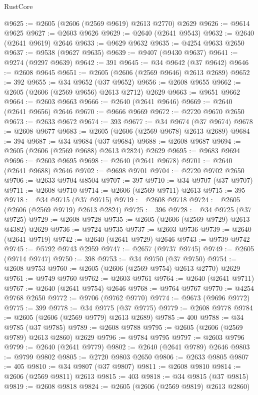 \begin{lexlean}{RustCore}
\begin{coremodule}
@9625 := @2605 (@2606 (@2569 @9619) @2613 @2770) @2629
@9626 := @9614 @9625
@9627 := @2603 @9626
@9629 := @2640 (@2641 @9543)
@9632 := @2640 (@2641 @9619) @2646
@9633 := @9629 @9632
@9635 := @4254 @9633 @2650
@9637 := @9538 (@9627 @9635)
@9639 := @9407 (@9430 @9637)
@9641 := @9274 (@9297 @9639)
@9642 := 391
@9645 := @34 @9642 (@37 @9642)
@9646 := @2608 @9645
@9651 := @2605 (@2606 (@2569 @9646) @2613 @2689)
@9652 := 392
@9655 := @34 @9652 (@37 @9652)
@9656 := @2608 @9655
@9662 := @2605 (@2606 (@2569 @9656) @2613 @2712) @2629
@9663 := @9651 @9662
@9664 := @2603 @9663
@9666 := @2640 (@2641 @9646)
@9669 := @2640 (@2641 @9656) @2646
@9670 := @9666 @9669
@9672 := @2720 @9670 @2650
@9673 := @2633 @9672
@9674 := 393
@9677 := @34 @9674 (@37 @9674)
@9678 := @2608 @9677
@9683 := @2605 (@2606 (@2569 @9678) @2613 @2689)
@9684 := 394
@9687 := @34 @9684 (@37 @9684)
@9688 := @2608 @9687
@9694 := @2605 (@2606 (@2569 @9688) @2613 @2824) @2629
@9695 := @9683 @9694
@9696 := @2603 @9695
@9698 := @2640 (@2641 @9678)
@9701 := @2640 (@2641 @9688) @2646
@9702 := @9698 @9701
@9704 := @2720 @9702 @2650
@9706 := @2633 @9704 @8504
@9707 := 397
@9710 := @34 @9707 (@37 @9707)
@9711 := @2608 @9710
@9714 := @2606 (@2569 @9711) @2613
@9715 := 395
@9718 := @34 @9715 (@37 @9715)
@9719 := @2608 @9718
@9724 := @2605 (@2606 (@2569 @9719) @2613 @2824)
@9725 := 396
@9728 := @34 @9725 (@37 @9725)
@9729 := @2608 @9728
@9735 := @2605 (@2606 (@2569 @9729) @2613 @4382) @2629
@9736 := @9724 @9735
@9737 := @2603 @9736
@9739 := @2640 (@2641 @9719)
@9742 := @2640 (@2641 @9729) @2646
@9743 := @9739 @9742
@9745 := @5792 @9743 @2959
@9747 := @2657 (@9737 @9745)
@9749 := @2605 (@9714 @9747)
@9750 := 398
@9753 := @34 @9750 (@37 @9750)
@9754 := @2608 @9753
@9760 := @2605 (@2606 (@2569 @9754) @2613 @2770) @2629
@9761 := @9749 @9760
@9762 := @2603 @9761
@9764 := @2640 (@2641 @9711)
@9767 := @2640 (@2641 @9754) @2646
@9768 := @9764 @9767
@9770 := @4254 @9768 @2650
@9772 := @9706 (@9762 @9770)
@9774 := @9673 (@9696 @9772)
@9775 := 399
@9778 := @34 @9775 (@37 @9775)
@9779 := @2608 @9778
@9784 := @2605 (@2606 (@2569 @9779) @2613 @2689)
@9785 := 400
@9788 := @34 @9785 (@37 @9785)
@9789 := @2608 @9788
@9795 := @2605 (@2606 (@2569 @9789) @2613 @2860) @2629
@9796 := @9784 @9795
@9797 := @2603 @9796
@9799 := @2640 (@2641 @9779)
@9802 := @2640 (@2641 @9789) @2646
@9803 := @9799 @9802
@9805 := @2720 @9803 @2650
@9806 := @2633 @9805
@9807 := 405
@9810 := @34 @9807 (@37 @9807)
@9811 := @2608 @9810
@9814 := @2606 (@2569 @9811) @2613
@9815 := 403
@9818 := @34 @9815 (@37 @9815)
@9819 := @2608 @9818
@9824 := @2605 (@2606 (@2569 @9819) @2613 @2860)

\end{coremodule}
\end{lexlean}

